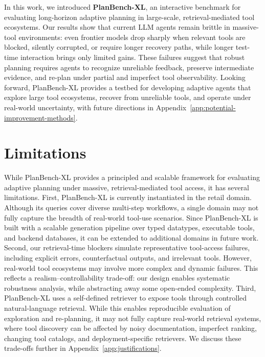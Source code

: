 \documentclass{llmxive}
\providecommand{\BENCH}[1]{\textbf{PlanBench-XL}}
\providecommand{\bench}[1]{PlanBench-XL}
\begin{document}
In this work, we introduced \BENCH{}, an interactive benchmark for evaluating long-horizon adaptive planning in large-scale, retrieval-mediated tool ecosystems.
Our results show that current LLM agents remain brittle in massive-tool environments: even frontier models drop sharply when relevant tools are blocked, silently corrupted, or require longer recovery paths, while longer test-time interaction brings only limited gains.
These failures suggest that robust planning requires agents to recognize unreliable feedback, preserve intermediate evidence, and re-plan under partial and imperfect tool observability.
Looking forward, \bench{} provides a testbed for developing adaptive agents that explore large tool ecosystems, recover from unreliable tools, and operate under real-world uncertainty, with future directions in Appendix~\ref{app:potential-improvement-methods}.






\section*{Limitations}



While \bench{} provides a principled and scalable framework for evaluating adaptive planning under massive, retrieval-mediated tool access, it has several limitations.
First, \bench{} is currently instantiated in the retail domain. Although its queries cover diverse multi-step workflows, a single domain may not fully capture the breadth of real-world tool-use scenarios. Since \bench{} is built with a scalable generation pipeline over typed datatypes, executable tools, and backend databases, it can be extended to additional domains in future work.
Second, our retrieval-time blockers simulate representative tool-access failures, including explicit errors, counterfactual outputs, and irrelevant tools. However, real-world tool ecosystems may involve more complex and dynamic failures. This reflects a realism--controllability trade-off: our design enables systematic robustness analysis, while abstracting away some open-ended complexity.
Third, \bench{} uses a self-defined retriever to expose tools through controlled natural-language retrieval. While this enables reproducible evaluation of exploration and re-planning, it may not fully capture real-world retrieval systems, where tool discovery can be affected by noisy documentation, imperfect ranking, changing tool catalogs, and deployment-specific retrievers.
We discuss these trade-offs further in Appendix~\ref{app:justifications}.
\end{document}

